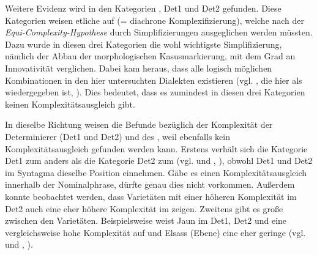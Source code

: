 Weitere Evidenz wird in den Kategorien , Det1 und Det2 gefunden. Diese Kategorien weisen etliche  auf (= diachrone Komplexifizierung), welche nach der \textit{Equi-Com\-ple\-xi\-ty-Hy\-po\-the\-se} durch Simplifizierungen ausgeglichen werden müssten. Dazu wurde in diesen drei Kategorien die wohl wichtigste Simplifizierung, nämlich der Abbau der morphologischen Kasusmarkierung, mit dem Grad an Innovativität verglichen. Dabei kam heraus, dass alle logisch möglichen Kombinationen in den hier untersuchten Dialekten existieren (vgl. , die hier als  wiedergegeben ist, ). Dies bedeutet, dass es zumindest in diesen drei Kategorien keinen Komplexitätsausgleich gibt.


\begin{table}
\caption{Innovationen und Archaismen in den alemannischen Dialekten ()}\label{table6.25}
\end{table}

In dieselbe Richtung weisen die Befunde bezüglich der Komplexität der Determinierer (Det1 und Det2) und des , weil ebenfalls kein Komplexitätsausgleich gefunden werden kann. Erstens verhält sich die Kategorie Det1 zum  anders als die Kategorie Det2 zum  (vgl.  und , ), obwohl Det1 und Det2 im Syntagma dieselbe Position einnehmen. Gäbe es einen Komplexitätsausgleich innerhalb der Nominalphrase, dürfte genau dies nicht vorkommen. Außerdem konnte beobachtet werden, dass Varietäten mit einer höheren Komplexität im Det2 auch eine eher höhere Komplexität im  zeigen. Zweitens gibt es große  zwischen den Varietäten. Beispielsweise weist Jaun im Det1, Det2 und  eine vergleichsweise hohe Komplexität auf und Elsass (Ebene) eine eher geringe (vgl.  und , ).

